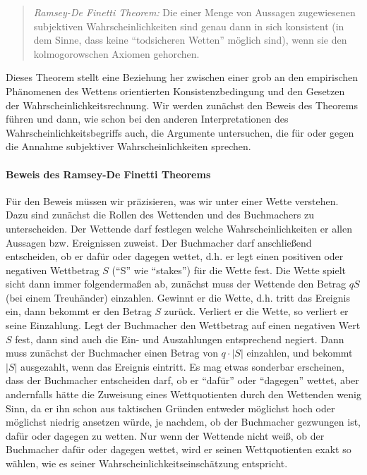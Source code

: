\begin{quote}
{\em Ramsey-De Finetti Theorem:} Die einer Menge von Aussagen zugewiesenen
subjektiven Wahrscheinlichkeiten sind genau dann in sich konsistent (in dem
Sinne, dass keine "`todsicheren Wetten"' möglich sind), wenn sie den
kolmogorowschen Axiomen gehorchen.
\end{quote}

Dieses Theorem stellt eine Beziehung her zwischen einer grob an den empirischen
Phänomenen des Wettens orientierten Konsistenzbedingung und den Gesetzen der
Wahrscheinlichkeitsrechnung. Wir werden zunächst den Beweis des Theorems führen
und dann, wie schon bei den anderen Interpretationen des
Wahrscheinlichkeitsbegriffs auch, die Argumente untersuchen, die für oder
gegen die Annahme subjektiver Wahrscheinlichkeiten sprechen. 

\paragraph{Beweis des Ramsey-De Finetti Theorems} Für den Beweis müssen wir
präzisieren, was wir unter einer Wette verstehen. Dazu sind zunächst die 
Rollen des Wettenden und des Buchmachers zu unterscheiden. Der
Wettende darf festlegen welche Wahrscheinlichkeiten er allen Aussagen bzw.
Ereignissen zuweist. Der Buchmacher darf anschließend entscheiden, ob er dafür
oder dagegen wettet, d.h. er legt einen positiven oder negativen Wettbetrag $S$
("`S"' wie "`stakes"') für die Wette fest. Die Wette spielt sicht dann immer
folgendermaßen ab, zunächst muss der Wettende den Betrag $qS$ (bei einem
Treuhänder) einzahlen. Gewinnt er die Wette, d.h. tritt das Ereignis ein, dann
bekommt er den Betrag $S$ zurück. Verliert er die Wette, so verliert er seine Einzahlung. 
Legt der Buchmacher den
Wettbetrag auf einen negativen Wert $S$ fest, dann sind auch die Ein- und
Auszahlungen entsprechend negiert. Dann muss zunächst der Buchmacher einen
Betrag von $q \cdot |S|$ einzahlen, und bekommt $|S|$ ausgezahlt, wenn das
Ereignis eintritt. Es mag etwas sonderbar erscheinen,
dass der Buchmacher entscheiden darf, ob er "`dafür"' oder "`dagegen"' wettet, 
aber andernfalls hätte die Zuweisung eines
Wettquotienten durch den Wettenden wenig Sinn, da er ihn schon aus taktischen
Gründen entweder möglichst hoch oder möglichst niedrig ansetzen würde, je
nachdem, ob der Buchmacher gezwungen ist, dafür oder dagegen zu wetten. Nur
wenn der Wettende nicht weiß, ob der Buchmacher dafür oder dagegen wettet, wird
er seinen Wettquotienten exakt so wählen, wie es seiner
Wahrscheinlichkeitseinschätzung entspricht. 


